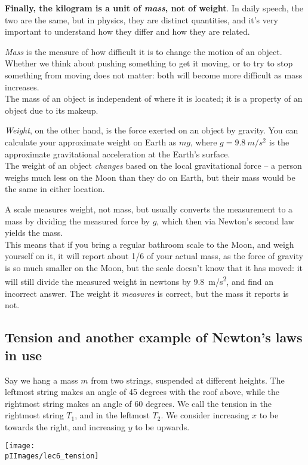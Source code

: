 \textbf{Finally, the kilogram is a unit of \emph{mass}, not of weight}. In daily speech, the two are the same, but in physics, they are distinct quantities, and it's very important to understand how they differ and how they are related.

\emph{Mass} is the measure of how difficult it is to change the motion of an object. Whether we think about pushing something to get it moving, or to try to stop something from moving does not matter: both will become more difficult as mass increases.\\
The mass of an object is independent of where it is located; it is a property of an object due to its makeup.

\emph{Weight}, on the other hand, is the force exerted on an object by gravity. You can calculate your approximate weight on Earth as $m g$, where $g = \SI{9.8}{m/s^2}$ is the approximate gravitational acceleration at the Earth's surface.\\
The weight of an object \emph{changes} based on the local gravitational force -- a person weighs much less on the Moon than they do on Earth, but their mass would be the same in either location.

A scale measures weight, not mass, but usually converts the measurement to a mass by dividing the measured force by $g$, which then via Newton's second law yields the mass.\\
This means that if you bring a regular bathroom scale to the Moon, and weigh yourself on it, it will report about 1/6 of your actual mass, as the force of gravity is so much smaller on the Moon, but the scale doesn't know that it has moved: it will still divide the measured weight in newtons by \SI{9.8}{m/s^2}, and find an incorrect answer. The weight it \emph{measures} is correct, but the mass it reports is not.

\subsection{Tension and another example of Newton's laws in use}

Say we hang a mass $m$ from two strings, suspended at different heights. The leftmost string makes an angle of 45 degrees with the roof above, while the rightmost string makes an angle of 60 degrees. We call the tension in the rightmost string $T_1$, and in the leftmost $T_2$. We consider increasing $x$ to be towards the right, and increasing $y$ to be upwards.

\begin{center}
\texttt{[image: \\pIImages/lec6\_tension]}
\end{center}

